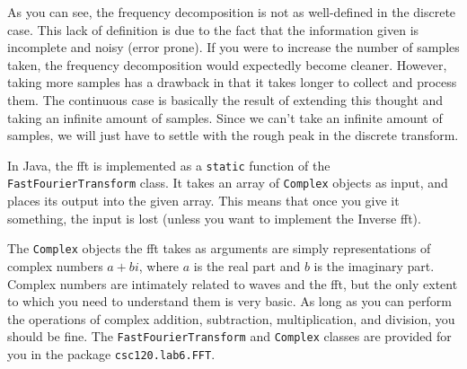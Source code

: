 As you can see, the frequency decomposition is not as well-defined in the discrete case.
This lack of definition is due to the fact that the information given is incomplete and noisy (error prone).
If you were to increase the number of samples taken, the frequency decomposition would expectedly become cleaner.
However, taking more samples has a drawback in that it takes longer to collect and process them.
The continuous case is basically the result of extending this thought and taking an infinite amount of samples.
Since we can't take an infinite amount of samples, we will just have to settle with the rough peak in the discrete transform.

In Java, the \ac{fft} is implemented as a \verb=static= function of the {\tt FastFourierTransform} class.
It takes an array of \verb=Complex= objects as input, and places its output into the given array.
This means that once you give it something, the input is lost (unless you want to implement the Inverse \ac{fft}).

The \verb=Complex= objects the \ac{fft} takes as arguments are simply representations of complex numbers $a+bi$, where $a$ is the real part and $b$ is the imaginary part.
Complex numbers are intimately related to waves and the \ac{fft}, but the only extent to which you need to understand them is very basic.
As long as you can perform the operations of complex addition, subtraction, multiplication, and division, you should be fine.
The \verb=FastFourierTransform= and \verb=Complex= classes are provided for you in the package {\tt csc120.lab6.FFT}.